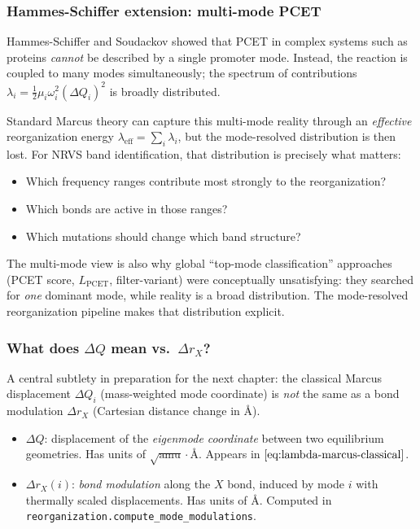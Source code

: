 \documentclass[11pt,a4paper,twoside]{article}
\providecommand{\angstrom}{\text{\AA}}    %
\theoremstyle{remark}
\begin{document}
\subsubsection*{Hammes-Schiffer extension: multi-mode PCET}

Hammes-Schiffer and Soudackov \cite{HammesSchifferSoudackov2008}
showed that PCET in complex systems such as proteins \emph{cannot}
be described by a single promoter mode. Instead, the reaction is
coupled to many modes simultaneously; the spectrum of contributions
$\lambda_i = \tfrac{1}{2}\mu_i\omega_i^2(\Delta Q_i)^2$ is broadly
distributed.

Standard Marcus theory can capture this multi-mode reality through
an \emph{effective} reorganization energy
$\lambda_\text{eff} = \sum_i \lambda_i$, but the mode-resolved
distribution is then lost. For NRVS band identification, that
distribution is precisely what matters:

\begin{itemize}\setlength{\itemsep}{0pt}
  \item Which frequency ranges contribute most strongly to the
        reorganization?
  \item Which bonds are active in those ranges?
  \item Which mutations should change which band structure?
\end{itemize}

The multi-mode view is also why global ``top-mode classification''
approaches (PCET score, $L_\text{PCET}$, filter-variant) were
conceptually unsatisfying: they searched for \emph{one} dominant
mode, while reality is a broad distribution. The mode-resolved
reorganization pipeline makes that distribution explicit.

\subsubsection*{What does $\Delta Q$ mean vs.\ $\Delta r_X$?}

A central subtlety in preparation for the next chapter: the
classical Marcus displacement $\Delta Q_i$ (mass-weighted mode
coordinate) is \emph{not} the same as a bond modulation
$\Delta r_X$ (Cartesian distance change in $\angstrom$).

\begin{itemize}\setlength{\itemsep}{0pt}
  \item $\Delta Q$: displacement of the \emph{eigenmode coordinate}
        between two equilibrium geometries. Has units of
        $\sqrt{\text{amu}}\cdot\angstrom$. Appears in
        $\eqref{eq:lambda-marcus-classical}$.
  \item $\Delta r_X(i)$: \emph{bond modulation} along the $X$ bond,
        induced by mode $i$ with thermally scaled displacements.
        Has units of $\angstrom$. Computed in
        \texttt{reorganization.compute\_mode\_modulations}.
\end{itemize}
\end{document}
